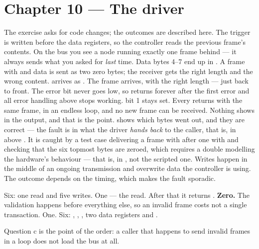 \section*{Chapter 10 --- The driver}

The exercise asks for code changes; the outcomes are described here.
 The trigger is written before the data registers, so the controller reads the previous
frame's contents. On the bus you see a node running exactly one frame behind --- it always sends
what you asked for \emph{last} time.
 Data bytes 4--7 end up in . A frame with  and data
 is sent as two zero bytes; the receiver gets the right length and the wrong content.
  arrives as . The frame arrives, with the right length
--- just back to front.
 The error bit never goes low, so  returns  forever after the
first error and all error handling above stops working.
  bit 1 stays set. Every  returns  with the same
frame, in an endless loop, and no new frame can be received.
 Nothing shows in the output, and that is the point.  shows which
bytes went out, and they are correct --- the fault is in what the driver \emph{hands back} to the
caller, that is, in  above . It is caught by a test case delivering a
frame with  after one with  and checking that the six topmost bytes
are zeroed, which requires a double modelling the hardware's behaviour --- that is,
 in , not the scripted one.
 Writes happen in the middle of an ongoing transmission and overwrite data the controller
is using. The outcome depends on the timing, which makes the fault sporadic.

 Six: one  read and five writes.
 One --- the  read. After that it returns .
 \textbf{Zero.} The validation happens before everything else, so an invalid frame costs
not a single transaction.
 One.
 Six: , , , two data registers and .

Question c is the point of the order: a caller that happens to send invalid frames in a loop does
not load the bus at all.

